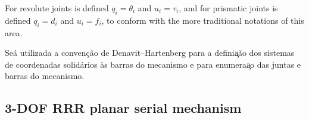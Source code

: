\documentclass[a4paper,11pt,brazil,fleqn]{article}
\begin{document}
For revolute joints is defined $q_i = \theta_i$ and $u_i = \tau_i$, and for prismatic joints is defined $q_i = d_i$ and $u_i = f_i$, to conform with the more traditional notations of this area.

Se\'{a} utilizada a conven\c{c}\~{a}o de Denavit–Hartenberg para a defini\c{a}\~{a}o dos sistemas de coordenadas solid\'{a}rios \`{a}s barras do mecanismo e para enumera\c{a}o das juntas e barras do mecanismo.

\subsection{3-DOF RRR planar serial mechanism}\label{S03-1}
\end{document}
